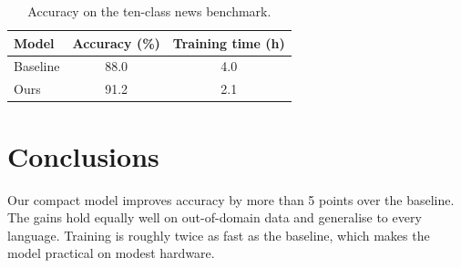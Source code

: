 \documentclass{article}
\begin{document}
\begin{table}[h]
\centering
\caption{Accuracy on the ten-class news benchmark.}
\label{tab:main}
\begin{tabular}{lcc}
\toprule
Model & Accuracy (\%) & Training time (h) \\
\midrule
Baseline & 88.0 & 4.0 \\
Ours & 91.2 & 2.1 \\
\bottomrule
\end{tabular}
\end{table}

\section{Conclusions}
Our compact model improves accuracy by more than 5 points over the baseline.
The gains hold equally well on out-of-domain data and generalise to every language.
Training is roughly twice as fast as the baseline, which makes the model practical on modest hardware.



\end{document}

